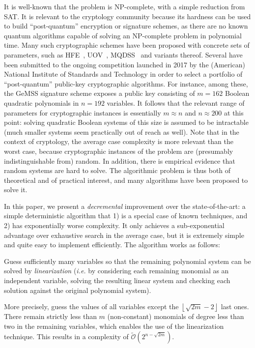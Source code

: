 \documentclass[a4paper,UKenglish,cleveref, autoref]{lipics-v2019}
\newcommand{\bigOsoft}[1]{\ensuremath{\mathcal{\tilde O}\left( #1 \right)} }
\begin{document}
It is well-known that the problem is NP-complete, with a simple reduction from
SAT. It is relevant to the cryptology community because its hardness can be used
to build ``post-quantum'' encryption or signature schemes, as there are no known
quantum algorithms capable of solving an NP-complete problem in polynomial
time. Many such cryptographic schemes have been proposed with concrete sets of
parameters, such as HFE~\cite{Patarin96}, UOV~\cite{KipnisPG99},
MQDSS~\cite{ChenHRSS16} and variants thereof. Several have been submitted to the
ongoing competition launched in 2017 by the (American) National Institute of
Standards and Technology in order to select a portfolio of ``post-quantum''
public-key cryptographic algorithms. For instance, among these, the
\textsf{GeMSS} signature scheme exposes a public key consisting of $m=162$
Boolean quadratic polynomials in $n=192$ variables. It follows that the relevant
range of parameters for cryptographic instances is essentially $m \approx n$ and
$n \approx 200$ at this point: solving quadratic Boolean systems of this size is
assumed to be intractable (much smaller systems seem practically out of reach as
well). Note that in the context of cryptology, the average case complexity is
more relevant than the worst case, because cryptographic instances of the
problem are (presumably indistinguishable from) random. In addition, there is
empirical evidence that random systems are hard to solve. The algorithmic
problem is thus both of theoretical and of practical interest, and many
algorithms have been proposed to solve it.

In this paper, we present a \emph{decremental} improvement over the
state-of-the-art: a simple deterministic algorithm that 1) is a special case of
known techniques, and 2) has exponentially worse complexity. It only achieves a
sub-exponential advantage over exhaustive search in the average case, but it is
extremely simple and quite easy to implement efficiently. The algorithm works as
follows:

\begin{framed}
  Guess sufficiently many variables so that the remaining polynomial system can
  be solved by \emph{linearization} (\textit{i.e.} by considering each remaining
  monomial as an independent variable, solving the resulting linear system and
  checking each solution against the original polynomial system).
\end{framed}

More precisely, guess the values of all variables except the
$\left\lfloor \sqrt{2m} - 2 \right\rfloor$ last ones. There remain strictly less
than $m$ (non-constant) monomials of degree less than two in the remaining
variables, which enables the use of the linearization technique. This results in
a complexity of $\bigOsoft{2^{n - \sqrt{2m}}}$.
\end{document}
